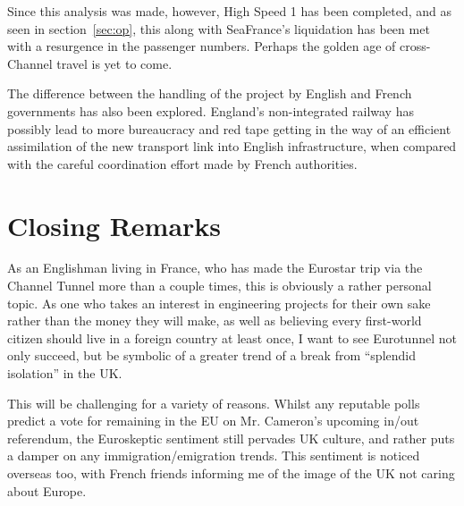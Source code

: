 \documentclass[12pt]{article} %
\begin{document}
Since this analysis was made, however, High Speed 1 has been completed, and as seen in section~\ref{sec:op}, this along with SeaFrance's liquidation has been met with a resurgence in the passenger numbers. Perhaps the golden age of cross-Channel travel is yet to come.

The difference between the handling of the project by English and French governments has also been explored. England's non-integrated railway has possibly lead to more bureaucracy and red tape getting in the way of an efficient assimilation of the new transport link into English infrastructure, when compared with the careful coordination effort made by French authorities.

\section{Closing Remarks}
As an Englishman living in France, who has made the Eurostar trip via the Channel Tunnel more than a couple times, this is obviously a rather personal topic. As one who takes an interest in engineering projects for their own sake rather than the money they will make, as well as believing every first-world citizen should live in a foreign country at least once, I want to see Eurotunnel not only succeed, but be symbolic of a greater trend of a break from ``splendid isolation'' in the UK.

This will be challenging for a variety of reasons. Whilst any reputable polls predict a vote for remaining in the EU on Mr. Cameron's upcoming in\slash out referendum, the Euroskeptic sentiment still pervades UK culture, and rather puts a damper on any immigration\slash emigration trends. This sentiment is noticed overseas too, with French friends informing me of the image of the UK not caring about Europe.
\end{document}
